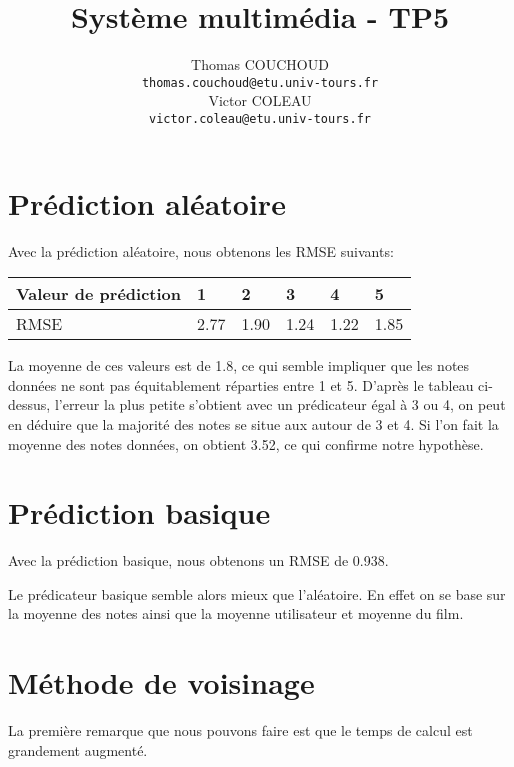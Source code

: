 \documentclass{report}
\title{Système multimédia - TP5}
\author{Thomas COUCHOUD\\\texttt{thomas.couchoud@etu.univ-tours.fr}\\Victor COLEAU\\\texttt{victor.coleau@etu.univ-tours.fr}}
\begin{document}
	\mccTitle

	\section{Prédiction aléatoire}
		Avec la prédiction aléatoire, nous obtenons les RMSE suivants:
		
		\begin{tabularx}{\textwidth}{|X|X|X|X|X|X|}
			\hline
			Valeur de prédiction & 1 & 2 & 3 & 4 & 5\\\hline
			RMSE & 2.77 & 1.90 & 1.24 & 1.22 & 1.85\\\hline
		\end{tabularx}
		
		La moyenne de ces valeurs est de 1.8, ce qui semble impliquer que les notes données ne sont pas équitablement réparties entre 1 et 5.
		D'après le tableau ci-dessus, l'erreur la plus petite s'obtient avec un prédicateur égal à 3 ou 4, on peut en déduire que la majorité des notes se situe aux autour de 3 et 4.
		Si l'on fait la moyenne des notes données, on obtient 3.52, ce qui confirme notre hypothèse.
		
	\section{Prédiction basique}
		Avec la prédiction basique, nous obtenons un RMSE de 0.938.
		
		Le prédicateur basique semble alors mieux que l'aléatoire.
		En effet on se base sur la moyenne des notes ainsi que la moyenne utilisateur et moyenne du film.
		
	\section{Méthode de voisinage}
		La première remarque que nous pouvons faire est que le temps de calcul est grandement augmenté.
	
\end{document}
